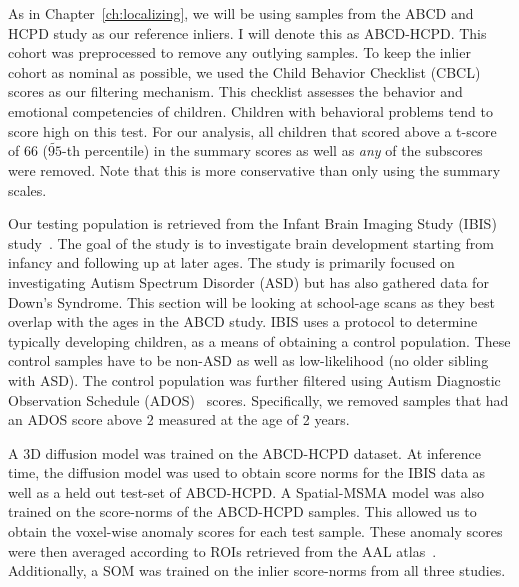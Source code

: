 As in Chapter~\ref{ch:localizing}, we will be using samples from the ABCD and HCPD study as our reference inliers. I will denote this as ABCD-HCPD. This cohort was preprocessed to remove any outlying samples. To keep the inlier cohort as nominal as possible, we used the Child Behavior Checklist (CBCL)~\cite{achenbachChildBehaviorChecklist1999} scores as our filtering mechanism. This checklist assesses the behavior and emotional competencies of children. Children with behavioral problems tend to score high on this test. For our analysis, all children that scored above a t-score of 66 ($\tilde{95}$-th percentile) in the summary scores as well as \textit{any} of the subscores were removed. Note that this is more conservative than only using the summary scales.

Our testing population is retrieved from the Infant Brain Imaging Study (IBIS) study~. The goal of the study is to investigate brain development starting from infancy and following up at later ages. The study is primarily focused on investigating Autism Spectrum Disorder (ASD) but has also gathered data for Down's Syndrome. This section will be looking at school-age scans as they best overlap with the ages in the ABCD study. IBIS uses a protocol to determine typically developing children, as a means of obtaining a control population. These control samples have to be non-ASD as well as low-likelihood (no older sibling with ASD). The control population was further filtered using Autism Diagnostic Observation Schedule (ADOS)~ scores. Specifically, we removed samples that had an ADOS score above 2 measured at the age of 2 years.

A 3D diffusion model was trained on the ABCD-HCPD dataset. At inference time, the diffusion model was used to obtain score norms for the IBIS data as well as a held out test-set of ABCD-HCPD. A Spatial-MSMA model was also trained on the score-norms of the ABCD-HCPD samples. This allowed us to obtain the voxel-wise anomaly scores for each test sample. These anomaly scores were then averaged according to ROIs retrieved from the AAL atlas~\cite{ROLLS2020116189}. Additionally, a SOM was trained on the inlier score-norms from all three studies. 


